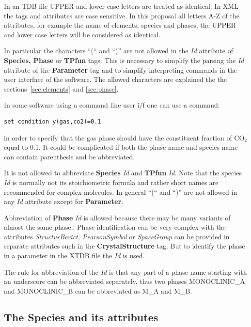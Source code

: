 \documentclass{article}
\begin{document}
In an TDB file UPPER and lower case letters are treated as identical.
In XML the tags and attributes are case sensitive.  In this proposal
all letters A-Z of the attributes, for example the name of elements,
species and phases, the UPPER and lower case letters will be
considered as identical.

In particular the characters ``(`` and ``)'' are not allowed in the
{\em Id} attribute of {\bf Species, Phase} or {\bf TPfun} tags.  This
is necessary to simplify the parsing the {\em Id} attribute of the
{\bf Parameter} tag and to simplify interpreting commands in the user
interface of the software.  The allowed characters are explained the
the sections~\ref{sec:elements} and \ref{sec:phase}.

In some software using a command line user i/f one can use a command:

\vspace{-3mm}
\begin{verbatim}
set condition y(gas,co2)=0.1
\end{verbatim}
\noindent
in order to specify that the gas phase should have the constituent
fraction of CO$_2$ equal to 0.1.  It could be complicated if both the
phase name and species name can contain parenthesis and be
abbreviated.

It is not allowed to abbreviate {\bf Species} {\em Id} and {\bf TPfun}
{\em Id}.  Note that the species {\em Id} is normally not its
stoichiometric formula and rather short names are recommended for
complex molecules.  In general ``(`` and ``)'' are not allowed in any
{\em Id} attribute except for {\bf Parameter}.

Abbreviation of {\bf Phase} {\em Id} is allowed because there may be
many variants of almost the same phase..  Phase identification can be
very complex with the attributes {\em StructurBerict,
  PearsonSymbol} or {\em SpaceGroup} can be provided in separate
attributes such in the {\bf CrystalStructure} tag.  But to identify
the phase in a parameter in the XTDB file the {\em Id} is used.

The rule for abbreviation of the {\em Id} is that any part of a phase
name starting with an underscore can be abbreviated separately, thus
two phases MONOCLINIC\_A and MONOCLINIC\_B can be abbreviated as M\_A
and M\_B.

\subsection{The Species and its attributes}\label{sec:speciesID}
\end{document}
